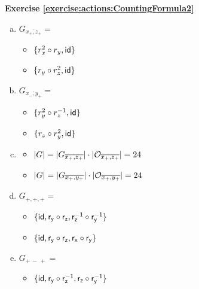 \noindent\textbf{Exercise \ref{exercise:actions:CountingFormula2}}
\begin{enumerate}[(a)]
\item 
$G_{\overline{x_+,z_+}}=$
	\begin{itemize}
	\item
	$\{r_x^2\circ r_y, \sf{id}\}$
	
	\item
	$\{r_y\circ r_z^2, \sf{id}\}$
	\end{itemize}
	
\item 
$G_{\overline{x_-,y_+}}=$
	\begin{itemize}
	\item
	$\{r_y^2\circ r_z^{-1}, \sf{id}\}$
	
	\item
	$\{r_z\circ r_y^{2}, \sf{id}\}$
	\end{itemize}
	
\item 
	\begin{itemize}
	\item
	$|G| = |G_{\overline{x_+,z_+}}| \cdot |{\cal O}_{\overline{x_+,z_+}}| = 24$
	
	\item
	$|G| = |G_{\overline{x_+,y_+}}| \cdot |{\cal O}_{\overline{x_+,y_+}}| = 24$
	\end{itemize}
	
\item 
$G_{+,+,+}=$
	\begin{itemize}
	\item
	$\{\sf{id}, r_y\circ r_z, r_z^{-1}\circ r_y^{-1} \}$
	
	\item
	$\{\sf{id}, r_y\circ r_z, r_x\circ r_y \}$
	\end{itemize}
	
\item 
$G_{+\,-\,+}=$
	\begin{itemize}
	\item
	$\{\sf{id}, r_y\circ r_z^{-1}, r_z\circ r_y^{-1} \}$
	

\end{itemize}
\end{enumerate}
